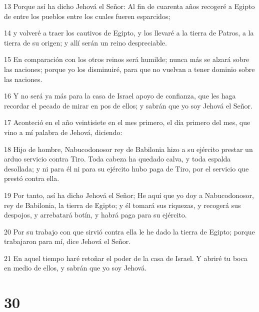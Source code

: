 \par 13 Porque así ha dicho Jehová el Señor: Al fin de cuarenta años recogeré a Egipto de entre los pueblos entre los cuales fueren esparcidos;
\par 14 y volveré a traer los cautivos de Egipto, y los llevaré a la tierra de Patros, a la tierra de su origen; y allí serán un reino despreciable.
\par 15 En comparación con los otros reinos será humilde; nunca más se alzará sobre las naciones; porque yo los disminuiré, para que no vuelvan a tener dominio sobre las naciones.
\par 16 Y no será ya más para la casa de Israel apoyo de confianza, que les haga recordar el pecado de mirar en pos de ellos; y sabrán que yo soy Jehová el Señor.
\par 17 Aconteció en el año veintisiete en el mes primero, el día primero del mes, que vino a mí palabra de Jehová, diciendo:
\par 18 Hijo de hombre, Nabucodonosor rey de Babilonia hizo a su ejército prestar un arduo servicio contra Tiro. Toda cabeza ha quedado calva, y toda espalda desollada; y ni para él ni para su ejército hubo paga de Tiro, por el servicio que prestó contra ella.
\par 19 Por tanto, así ha dicho Jehová el Señor; He aquí que yo doy a Nabucodonosor, rey de Babilonia, la tierra de Egipto; y él tomará sus riquezas, y recogerá sus despojos, y arrebatará botín, y habrá paga para su ejército.
\par 20 Por su trabajo con que sirvió contra ella le he dado la tierra de Egipto; porque trabajaron para mí, dice Jehová el Señor.
\par 21 En aquel tiempo haré retoñar el poder de la casa de Israel. Y abriré tu boca en medio de ellos, y sabrán que yo soy Jehová.

\chapter{30}

